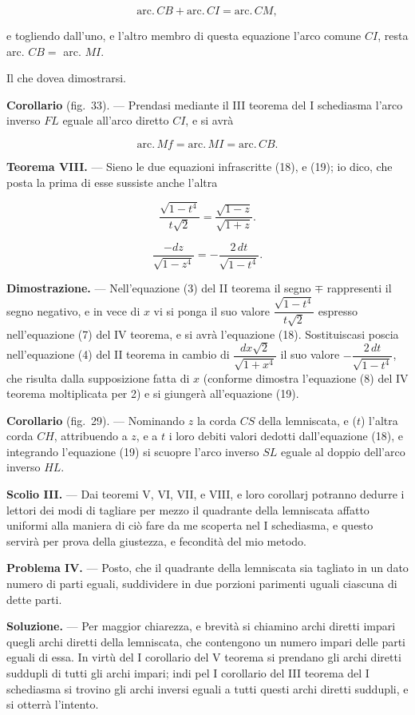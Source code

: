 \documentclass{article}
\begin{document}
\[ \mathrm{arc.}\,CB + \mathrm{arc.}\,CI = \mathrm{arc.}\,CM, \]

e togliendo dall'uno, e l'altro membro di questa equazione l'arco comune $CI$, resta arc.
$CB = $ arc. $MI$.

Il che dovea dimostrarsi.

\textbf{Corollario} (fig.~33). --- Prendasi mediante il III teorema del I schediasma l'arco
inverso $FL$ eguale all'arco diretto $CI$, e si avrà

\[ \mathrm{arc.}\,Mf = \mathrm{arc.}\,MI = \mathrm{arc.}\,CB. \]

\textbf{Teorema VIII.} --- Sieno le due equazioni infrascritte (18), e (19); io dico, che posta la
prima di esse sussiste anche l'altra

\[ \frac{\sqrt{1-t^{4}}}{t\sqrt{2}} = \frac{\sqrt{1-z}}{\sqrt{1+z}}. \tag{18} \]

\[ \frac{-dz}{\sqrt{1-z^{4}}} = -\frac{2\,dt}{\sqrt{1-t^{4}}}. \tag{19} \]

\textbf{Dimostrazione.} --- Nell'equazione (3) del II teorema il segno $\mp$ rappresenti il segno
negativo, e in vece di $x$ vi si ponga il suo valore $\dfrac{\sqrt{1-t^{4}}}{t\sqrt{2}}$ espresso
nell'equazione (7) del IV teorema, e si avrà l'equazione (18). Sostituiscasi poscia nell'equazione
(4) del II teorema in cambio di $\dfrac{dx\sqrt{2}}{\sqrt{1+x^{4}}}$ il suo valore
$-\dfrac{2\,dt}{\sqrt{1-t^{4}}}$, che risulta dalla supposizione fatta di $x$ (conforme dimostra
l'equazione (8) del IV teorema moltiplicata per 2) e si giungerà all'equazione (19).

\textbf{Corollario} (fig.~29). --- Nominando $z$ la corda $CS$ della lemniscata, e ($t$) l'altra
corda $CH$, attribuendo a $z$, e a $t$ i loro debiti valori dedotti dall'equazione (18), e
integrando l'equazione (19) si scuopre l'arco inverso $SL$ eguale al doppio dell'arco inverso $HL$.

\textbf{Scolio III.} --- Dai teoremi V, VI, VII, e VIII, e loro corollarj potranno dedurre i
lettori dei modi di tagliare per mezzo il quadrante della lemniscata affatto uniformi alla maniera
di ciò fare da me scoperta
nel I schediasma, e questo servirà per prova della giustezza, e fecondità del mio metodo.

\textbf{Problema IV.} --- Posto, che il quadrante della lemniscata sia tagliato in un dato numero
di parti eguali, suddividere in due porzioni parimenti uguali ciascuna di dette parti.

\textbf{Soluzione.} --- Per maggior chiarezza, e brevità si chiamino archi diretti impari quegli
archi diretti della lemniscata, che contengono un numero impari delle parti eguali di essa. In
virtù del I corollario del V teorema si prendano gli archi diretti suddupli di tutti gli archi
impari; indi pel I corollario del III teorema del I schediasma si trovino gli archi inversi
eguali a tutti questi archi diretti suddupli, e si otterrà l'intento.
\end{document}
